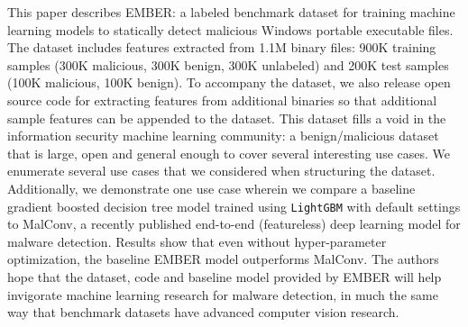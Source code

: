 This paper describes EMBER: a labeled benchmark dataset for training machine learning models to statically detect malicious Windows portable executable files.  The dataset includes features extracted from 1.1M binary files: 900K training samples (300K malicious, 300K benign, 300K unlabeled) and 200K test samples (100K malicious, 100K benign).  To accompany the dataset, we also release open source code for extracting features from additional binaries so that additional sample features can be appended to the dataset. This dataset fills a void in the information security machine learning community: a benign/malicious dataset that is large, open and general enough to cover several interesting use cases. We enumerate several use cases that we considered when structuring the dataset. Additionally, we demonstrate one use case wherein we compare a baseline gradient boosted decision tree model trained using \texttt{LightGBM} with default settings to MalConv, a recently published end-to-end (featureless) deep learning model for malware detection. Results show that even without hyper-parameter optimization, the baseline EMBER model outperforms MalConv. The authors hope that the dataset, code and baseline model provided by EMBER will help invigorate machine learning research for malware detection, in much the same way that benchmark datasets have advanced computer vision research.